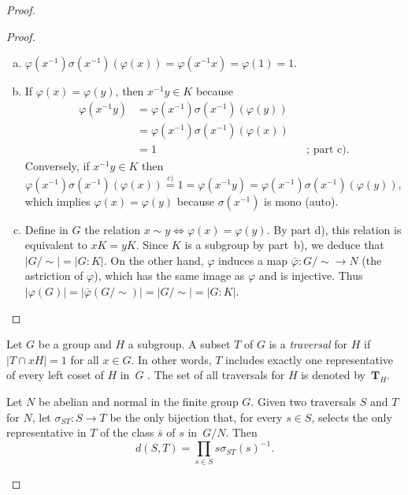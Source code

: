 \begin{proof}
\begin{proof}
\begin{enumerate}[a),font=\upshape]
    \item $\varphi(x^{-1})\sigma(x^{-1})(\varphi(x))
        = \varphi(x^{-1}x)=\varphi(1)=1$.

    \item If $\varphi(x)=\varphi(y)$, then $x^{-1}y\in K$ because
        \begin{align*}
            \varphi(x^{-1}y) &= \varphi(x^{-1})\sigma(x^{-1})(\varphi(y))\\
                &= \varphi(x^{-1})\sigma(x^{-1})(\varphi(x))\\
                &= 1    &&\text{; part c)}.
        \end{align*}
        Conversely, if $x^{-1}y\in K$ then
        $$
            \varphi(x^{-1})\sigma(x^{-1})(\varphi(x)) \stackrel{c)}= 1
                = \varphi(x^{-1}y)
                = \varphi(x^{-1})\sigma(x^{-1})(\varphi(y)),
        $$
        which implies $\varphi(x)=\varphi(y)$ because $\sigma(x^{-1})$ is mono (auto).

    \item Define in $G$ the relation $x\sim y\iff\varphi(x)=\varphi(y)$. By part d), this relation is equivalent to $xK=yK$. Since $K$ is a subgroup by part~b), we deduce that $|G/{\sim}|=|G:K|$. On the other hand, $\varphi$ induces a map $\bar\varphi\colon G/{\sim}\to N$ (the astriction of $\varphi$), which has the same image as $\varphi$ and is injective. Thus $|\varphi(G)|=|\bar\varphi(G/{\sim})|=|G/{\sim}|=|G:K|$.
\end{enumerate}
\end{proof}

\begin{defn}
    Let\/ $G$ be a group and\/ $H$ a subgroup. A subset\/ $T$ of\/ $G$ is a \textsl{traversal} for\/ $H$ if\/ $|T\cap xH|=1$ for all\/ $x\in G$. In other words, $T$ includes exactly one representative of every left coset of\/ $H$ in\/~$G$ {}. The set of all traversals for\/ $H$ is denoted by\/~$\mathbf T_H$.
\end{defn}

\begin{ntn}\label{traversal-sigma}
    Let\/ $N$ be abelian and normal in the finite group\/ $G$. Given two traversals\/ $S$ and\/ $T$ for\/ $N$, let\/ $\sigma_{ST}\colon S\to T$ be the only bijection that, for every\/ $s\in S$, selects the only representative in\/ $T$ of the class\/ $\bar s$ of $s$ in\/~$G/N$. Then
    $$
        d(S,T)=\prod_{s\in S}s\sigma_{ST}(s)^{-1}.
    $$
\end{ntn}


\end{proof}
